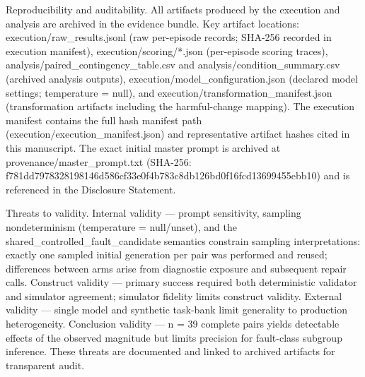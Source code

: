 \documentclass[conference]{IEEEtran}
\begin{document}
Reproducibility and auditability. All artifacts produced by the execution and analysis are archived in the evidence bundle. Key artifact locations: execution/raw\_results.jsonl (raw per-episode records; SHA-256 recorded in execution manifest), execution/scoring/*.json (per-episode scoring traces), analysis/paired\_contingency\_table.csv and analysis/condition\_summary.csv (archived analysis outputs), execution/model\_configuration.json (declared model settings; temperature = null), and execution/transformation\_manifest.json (transformation artifacts including the harmful-change mapping). The execution manifest contains the full hash manifest path (execution/execution\_manifest.json) and representative artifact hashes cited in this manuscript. The exact initial master prompt is archived at provenance/master\_prompt.txt (SHA-256: f781dd79\allowbreak{}78328198\allowbreak{}146d586c\allowbreak{}f33e0f4b\allowbreak{}783c8db1\allowbreak{}26bd0f16\allowbreak{}fcd13699\allowbreak{}455ebb10) and is referenced in the Disclosure Statement.

Threats to validity. Internal validity --- prompt sensitivity, sampling nondeterminism (temperature = null/unset), and the shared\_controlled\_fault\_candidate semantics constrain sampling interpretations: exactly one sampled initial generation per pair was performed and reused; differences between arms arise from diagnostic exposure and subsequent repair calls. Construct validity --- primary success required both deterministic validator and simulator agreement; simulator fidelity limits construct validity. External validity --- single model and synthetic task-bank limit generality to production heterogeneity. Conclusion validity --- n = 39 complete pairs yields detectable effects of the observed magnitude but limits precision for fault-class subgroup inference. These threats are documented and linked to archived artifacts for transparent audit.
\end{document}
